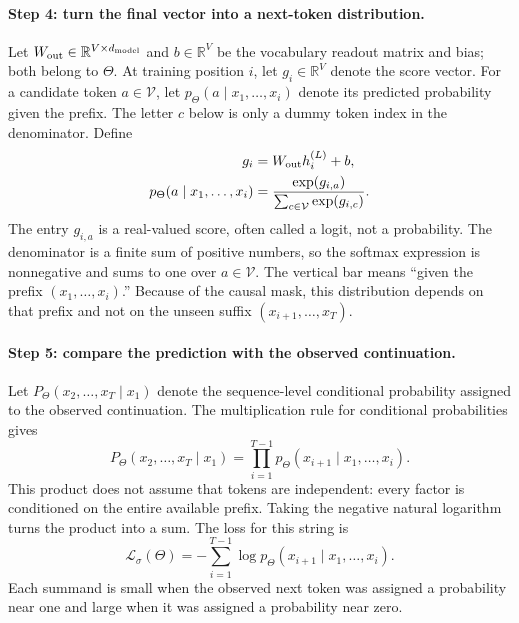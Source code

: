 \documentclass[
  aps,
  reprint,
  superscriptaddress,
  floatfix,
  nofootinbib,
  longbibliography
]{revtex4-2}
\newcommand{\R}{\mathbb{R}}
\begin{document}
\paragraph{Step 4: turn the final vector into a next-token distribution.}
Let $W_{\rm out}\in\R^{V\times d_{\rm model}}$ and $b\in\R^V$ be the
vocabulary readout matrix and bias; both belong to $\Theta$.  At training
position $i$, let $g_i\in\R^V$ denote the score vector.  For a candidate token
$a\in\mathcal V$, let $p_\Theta(a\mid x_1,\ldots,x_i)$ denote its predicted
probability given the prefix.  The letter $c$ below is only a dummy token index
in the denominator.  Define
\begin{equation}
\label{eq:app-training-softmax}
\begin{aligned}
g_i&=W_{\rm out}h_i^{(L)}+b,\\
p_\Theta(a\mid x_1,\ldots,x_i)
&=\frac{\exp(g_{i,a})}
{\sum_{c\in\mathcal V}\exp(g_{i,c})}.
\end{aligned}
\end{equation}
The entry $g_{i,a}$ is a real-valued score, often called a logit, not a
probability.  The denominator is a finite sum of positive numbers, so the
softmax expression is nonnegative and
sums to one over $a\in\mathcal V$.  The vertical bar means ``given the prefix
$(x_1,\ldots,x_i)$.''  Because of the causal mask, this distribution depends on
that prefix and not on the unseen suffix $(x_{i+1},\ldots,x_T)$.

\paragraph{Step 5: compare the prediction with the observed continuation.}
Let $P_\Theta(x_2,\ldots,x_T\mid x_1)$ denote the sequence-level conditional
probability assigned to the observed continuation.  The multiplication rule for
conditional probabilities gives
\begin{equation}
\label{eq:app-sequence-probability}
P_\Theta(x_2,\ldots,x_T\mid x_1)
=\prod_{i=1}^{T-1}
p_\Theta(x_{i+1}\mid x_1,\ldots,x_i).
\end{equation}
This product does not assume that tokens are independent: every factor is
conditioned on the entire available prefix.  Taking the negative natural
logarithm turns the product into a sum.  The loss for this string is
\begin{equation}
\label{eq:app-string-loss}
\mathcal L_\sigma(\Theta)
=-\sum_{i=1}^{T-1}
\log p_\Theta(x_{i+1}\mid x_1,\ldots,x_i).
\end{equation}
Each summand is small when the observed next token was assigned a probability
near one and large when it was assigned a probability near zero.
\end{document}
